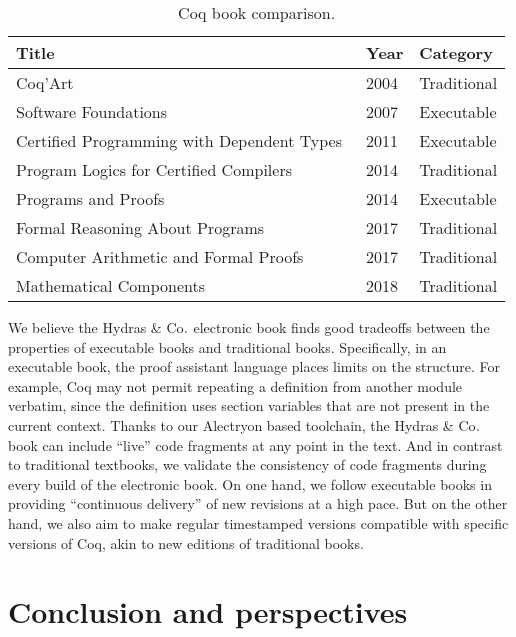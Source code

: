 \documentclass{easychair}
\newcommand{\alectr}{Alectryon\xspace}
\newcommand{\Hydras}{Hydras \& Co$\text.$\xspace}
\begin{document}
\begin{table}
  \centering
  \footnotesize
  \begin{tabular}{lll}
  \hline
  \textbf{Title} & \textbf{Year} & \textbf{Category}\\
  \hline
  Coq'Art~\cite{BC04} & 2004 & Traditional\\
  Software Foundations~\cite{Pierce2007} & 2007 & Executable\\
  Certified Programming with Dependent Types~\cite{chlipalacpdt2011} & 2011 &  Executable\\
  Program Logics for Certified Compilers~\cite{Appel2014} & 2014 & Traditional\\
  Programs and Proofs~\cite{Sergey:PnP} & 2014 & Executable\\
  Formal Reasoning About Programs~\cite{Chlipala2017} & 2017 & Traditional\\
  Computer Arithmetic and Formal Proofs~\cite{Boldo2017} & 2017 & Traditional\\
  Mathematical Components~\cite{MCB} & 2018 & Traditional\\
  \hline
  \end{tabular}
  \caption{Coq book comparison.}
  \label{tbl:books}
\end{table}

We believe the \Hydras electronic book finds good tradeoffs between the properties of executable books and traditional books. Specifically, in an executable book, the proof assistant language places limits on the structure. For example, Coq may not permit repeating a definition from another module verbatim, since the definition uses section variables that are not present in the current context. Thanks to our \alectr based toolchain, the \Hydras book can include ``live'' code fragments at any point in the text. And in contrast to traditional textbooks, we validate the consistency of code fragments during every build of the electronic book. On one hand, we follow executable books in providing ``continuous delivery'' of new revisions at a high pace. But on the other hand, we also aim to make regular timestamped versions compatible with specific versions of Coq, akin to new editions of traditional books.

\section{Conclusion and perspectives}
\end{document}
